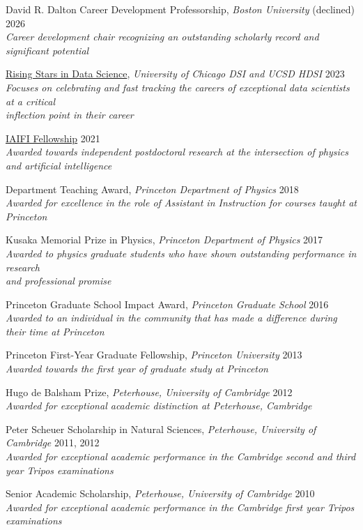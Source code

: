 \documentclass[letterpaper,11pt]{article}
\newenvironment{packed_itemize}{
\begin{itemize}[label=\raisebox{0.25ex}{\tiny$\bullet$}, topsep=0pt, partopsep=0pt]
  \setlength{\itemsep}{4.0pt}
  \setlength{\parskip}{0pt}
  \setlength{\parsep}{0pt}}{\end{itemize}
}
\begin{document}
\begin{packed_itemize}
  \item David R. Dalton Career Development Professorship, \emph{Boston University} (declined) \hfill 2026 \\ \emph{\small Career development chair recognizing an outstanding scholarly record and significant potential}
  \item \href{https://datascience.uchicago.edu/research/postdoctoral-programs/rising-stars-in-data-science-2/2023-rising-stars/}{Rising Stars in Data Science}, \emph{University of Chicago DSI and UCSD HDSI} \hfill 2023 \\ \emph{\small Focuses on celebrating and fast tracking the careers of exceptional data scientists at a critical \\ inflection point in their career}
  \item \href{https://iaifi.org/current-fellows.html}{IAIFI Fellowship} \hfill 2021 \\ \emph{\small Awarded towards independent postdoctoral research at the intersection of physics and artificial intelligence}
  \item Department Teaching Award, \emph{Princeton Department of Physics}  \hfill 2018 \\ \emph{\small Awarded for excellence in the role of Assistant in Instruction for courses taught at Princeton}
  \item Kusaka Memorial Prize in Physics, \emph{Princeton Department of Physics} \hfill 2017 \\ \emph{\small Awarded to physics graduate students who have shown outstanding performance in research \\ and professional promise}
  \item Princeton Graduate School Impact Award, \emph{Princeton Graduate School} \hfill 2016 \\ \emph{\small Awarded to an individual in the community that has made a difference during their time at Princeton}
  \item Princeton First-Year Graduate Fellowship, \emph{Princeton University} \hfill 2013 \\ \emph{\small Awarded towards the first year of graduate study at Princeton}
  \item Hugo de Balsham Prize, \emph{Peterhouse, University of Cambridge}  \hfill 2012 \\ \emph{\small Awarded for exceptional academic distinction at Peterhouse, Cambridge}
  \item Peter Scheuer Scholarship in Natural Sciences, \emph{Peterhouse, University of Cambridge} \hfill 2011, 2012 \\ \emph{\small Awarded for exceptional academic performance in the Cambridge second and third year Tripos examinations}
  \item Senior Academic Scholarship, \emph{Peterhouse, University of Cambridge} \hfill 2010\\ \emph{\small Awarded for exceptional academic performance in the Cambridge first year Tripos examinations}
\end{packed_itemize}
\end{document}
